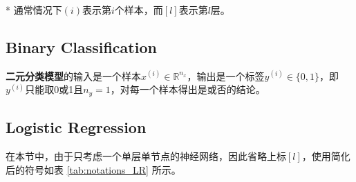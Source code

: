 \begin{table}[htb!]
\begin{threeparttable}
\begin{tabular}{clcc}
        \bottomrule
    \end{tabular}
    \label{tab:notations-chap1} %
    \begin{tablenotes}
        \item[*] 通常情况下$(i)$表示第$i$个样本，而$[l]$表示第$l$层。
    \end{tablenotes}
    \end{threeparttable}
\end{table}

\subsection{Binary Classification}
\textbf{二元分类模型}的输入是一个样本$x^{(i)} \in \mathbb{R}^{n_x}$，输出是一个标签$y^{(i)} \in \{0, 1\}$，即$y^{(i)}$只能取0或1且$n_y=1$，对每一个样本得出是或否的结论。

\subsection{Logistic Regression}

在本节中，由于只考虑一个单层单节点的神经网络，因此省略上标$[l]$，使用简化后的符号如表 \ref{tab:notations_LR} 所示。

